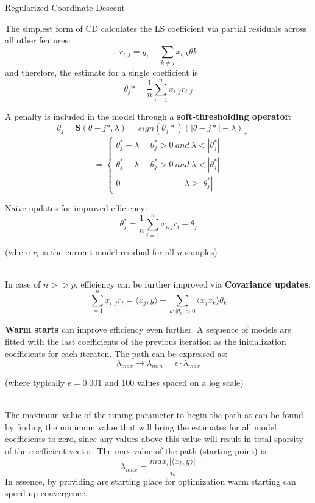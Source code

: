 \documentclass[11pt,compress,t,notes=noshow, xcolor=table]{beamer}
\begin{document}
\begin{vbframe}{Regularized Coordinate Descent}

The simplest form of CD calculates the LS coefficient via partial residuals across all other features:
$$r_{i,j} = y_{i} - \sum_{k \neq j} x_{i,k} \theta{k}$$
and therefore, the estimate for a single coefficient is
$$\theta_{j}* = \frac{1}{n} \sum_{i=1}^{n} x_{i,j}r_{i,j}$$

A penalty is included in the model through a \textbf{soft-thresholding operator}:
$$\theta_{j} = \bm{S}(\theta-{j}*, \lambda) = sign(\theta_{j}*)(|\theta-{j}*|-\lambda)_{+} = $$
$$ = \left\{ \begin{array}{rcl}
    \theta_{j}^{*} - \lambda ~~~~~~    \theta_{j}^{*}>0 ~ and ~ \lambda<|\theta_{j}^{*}| \\ 
    \theta_{j}^{*} + \lambda ~~~~~~    \theta_{j}^{*}>0 ~ and ~ \lambda<|\theta_{j}^{*}| \\ 
    0 ~~~~~~~~~~~~~~~~~~~~~~~~~~~~~~~~~~ \lambda \geq |\theta_{j}^{*}| 
   \end{array} \right. $$
   
\framebreak

Naive updates for improved efficiency:
$$\theta_{j}^{*} = \frac{1}{n} \sum_{i=1}^{n} x_{i,j}r_{i} + \theta_{j}$$
\begin{footnotesize}
(where $r_{i}$ is the current model residual for all $n$ samples)
\end{footnotesize} \\
In case of $n>>p$, efficiency can be further improved via \textbf{Covariance updates}:
$$\sum_{=1}^{n} x_{i,j}r_{i} = \langle x_{j},y \rangle - \sum_{k:|\theta_{k}|>0} \langle x_{j}x_{k} \rangle \theta_{k}$$

\framebreak

\textbf{Warm starts} can improve efficiency even further. A sequence of models are fitted with the last coefficients of the previous iteration as the initialization coefficients for each iteraten. The path can be expressed as:
$$\lambda_{max} \rightarrow \lambda_{min} = \epsilon \cdot \lambda_{max}$$
\begin{footnotesize}
(where typically $\epsilon=0.001$ and 100 values spaced on a log scale)
\end{footnotesize} \\
\vspace{0.5cm}
The maximum value of the tuning parameter to begin the path at can be found by finding the minimum value that will bring the estimates for all model coefficients to zero, since any values above this value will result in total sparsity of the coefficient vector. The max value of the path (starting point) is:
$$\lambda_{max} = \frac{max_{l}|\langle x_{l},y \rangle |}{n}$$
In essence, by providing are starting place for optimization warm starting can speed up convergence.

\end{vbframe}
\end{document}
